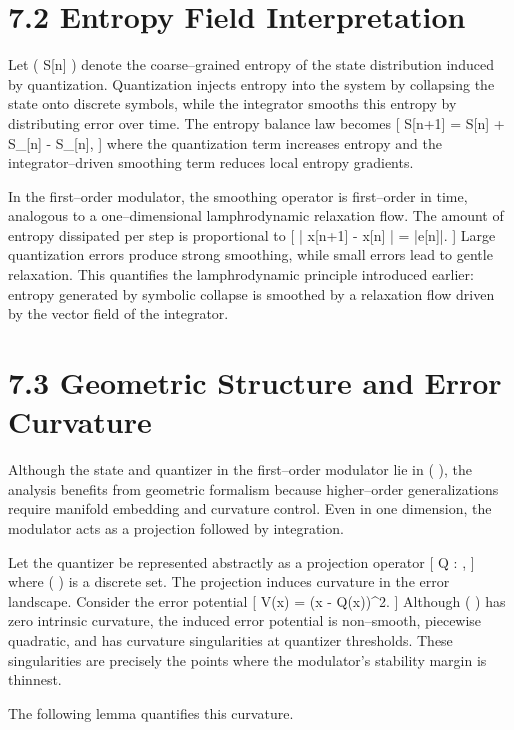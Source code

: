 \section{7.2 Entropy Field Interpretation}

Let ( S[n] ) denote the coarse–grained entropy of the state distribution induced by quantization. Quantization injects entropy into the system by collapsing the state onto discrete symbols, while the integrator smooths this entropy by distributing error over time. The entropy balance law becomes
[
S[n+1] = S[n] + \Delta S_{}[n] - \Delta S_{}[n],
]
where the quantization term increases entropy and the integrator–driven smoothing term reduces local entropy gradients.

In the first–order modulator, the smoothing operator is first–order in time, analogous to a one–dimensional lamphrodynamic relaxation flow. The amount of entropy dissipated per step is proportional to
[
\left| x[n+1] - x[n] \right| = |e[n]|.
]
Large quantization errors produce strong smoothing, while small errors lead to gentle relaxation. This quantifies the lamphrodynamic principle introduced earlier: entropy generated by symbolic collapse is smoothed by a relaxation flow driven by the vector field of the integrator.

\section{7.3 Geometric Structure and Error Curvature}

Although the state and quantizer in the first–order modulator lie in (  ), the analysis benefits from geometric formalism because higher–order generalizations require manifold embedding and curvature control. Even in one dimension, the modulator acts as a projection followed by integration.

Let the quantizer be represented abstractly as a projection operator
[
Q :  \rightarrow \Lambda,
]
where ( \Lambda \subset {} ) is a discrete set. The projection induces curvature in the error landscape. Consider the error potential
[
V(x) =  (x - Q(x))^{2}.
]
Although (  ) has zero intrinsic curvature, the induced error potential is non–smooth, piecewise quadratic, and has curvature singularities at quantizer thresholds. These singularities are precisely the points where the modulator’s stability margin is thinnest.

The following lemma quantifies this curvature.

